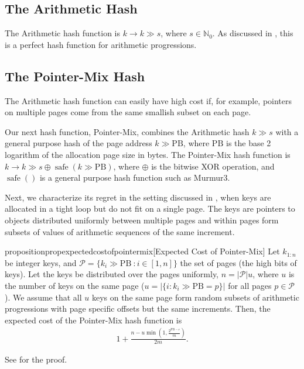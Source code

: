\documentclass[sigconf]{acmart}
\newcommand*{\natnumzero}{\mathbb{N}_0}
\renewcommand{\label}[1]{%
    \gdef\sfname{sf:##1}}%
\begin{document}
\subsection{The Arithmetic Hash}
\label{sec:the-arithmetic-hash}

The Arithmetic hash function is $k \rightarrow k \gg s$, where $s \in \natnumzero$.
As discussed in , this is a perfect hash function for arithmetic progressions.

\subsection{The Pointer-Mix Hash}
\label{sec:the-pointer-mix-hash}

The Arithmetic hash function can easily have high cost if, for example, pointers on multiple pages come from the same smallish subset on each page.

Our next hash function, Pointer-Mix, combines the Arithmetic hash $k \gg s$ with a general purpose hash of the page address $k \gg \mathrm{PB}$, where $\mathrm{PB}$ is the base 2 logarithm of the allocation page size in bytes.
The Pointer-Mix hash function is $k \rightarrow k \gg s \oplus \operatorname{safe}(k \gg \mathrm{PB})$, where $\oplus$ is the bitwise XOR operation, and $\operatorname{safe}()$ is a general purpose hash function such as Murmur3.

Next, we characterize its regret in the setting discussed in , when keys are allocated in a tight loop but do not fit on a single page.
The keys are pointers to objects distributed uniformly between multiple pages and within pages form subsets of values of arithmetic sequences of the same increment.

\begin{restatable}{proposition}{propexpectedcostofpointermix}[Expected Cost of Pointer-Mix]
Let $k_{1:n}$ be integer keys, and $\mathcal{P}=\{k_i \gg \mathrm{PB}\ \colon i \in [1,n]\}$ the set of pages (the high bits of keys).
Let the keys be distributed over the pages uniformly, $n=|\mathcal{P}|u$, where $u$ is the number of keys on the same page ($u=|\{i\colon k_i \gg \mathrm{PB} = p\}|$ for all pages $p \in \mathcal{P}$).
We assume that all $u$ keys on the same page form random subsets of arithmetic progressions with page specific offsets but the same increments.
Then, the expected cost of the Pointer-Mix hash function is
\begin{align*}
1+\frac{n - u \min(1,\frac{2^{\mathrm{PB} - s}}{m})}{2m}.
\end{align*}
\end{restatable}
\noindent See  for the proof.
\end{document}
